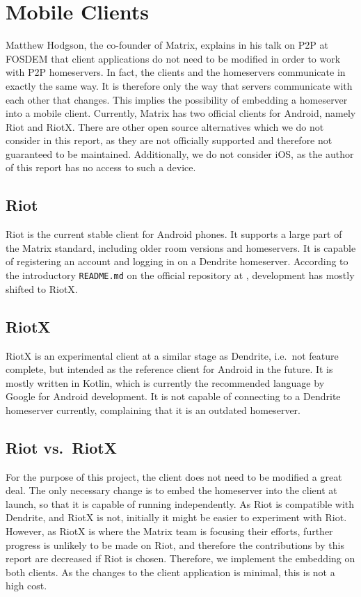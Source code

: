 \section{Mobile Clients}\label{sec:official_clients}
Matthew Hodgson, the co-founder of Matrix, explains in his talk on \ac{P2P} at FOSDEM\cite{fosdem_event_p2p_matrix} that client applications do not need to be modified in order to work with \ac{P2P} homeservers.
In fact, the clients and the homeservers communicate in exactly the same way.
It is therefore only the way that servers communicate with each other that changes.
This implies the possibility of embedding a homeserver into a mobile client.
Currently, Matrix has two official clients for Android, namely Riot and RiotX.
There are other open source alternatives which we do not consider in this report, as they are not officially supported and therefore not guaranteed to be maintained.
Additionally, we do not consider iOS, as the author of this report has no access to such a device.

\subsection{Riot}
Riot is the current stable client for Android phones.
It supports a large part of the Matrix standard, including older room versions and homeservers.
It is capable of registering an account and logging in on a Dendrite homeserver.
According to the introductory \texttt{README.md} on the official repository at , development has mostly shifted to RiotX.

\subsection{RiotX}
RiotX is an experimental client at a similar stage as Dendrite, i.e.~not feature complete, but intended as the reference client for Android in the future.
It is mostly written in Kotlin, which is currently the recommended language by Google for Android development.
It is not capable of connecting to a Dendrite homeserver currently, complaining that it is an outdated homeserver.

\subsection{Riot vs.~RiotX}
For the purpose of this project, the client does not need to be modified a great deal.
The only necessary change is to embed the homeserver into the client at launch, so that it is capable of running independently.
As Riot is compatible with Dendrite, and RiotX is not, initially it might be easier to experiment with Riot.
However, as RiotX is where the Matrix team is focusing their efforts, further progress is unlikely to be made on Riot, and therefore the contributions by this report are decreased if Riot is chosen.
Therefore, we implement the embedding on both clients.
As the changes to the client application is minimal, this is not a high cost.

